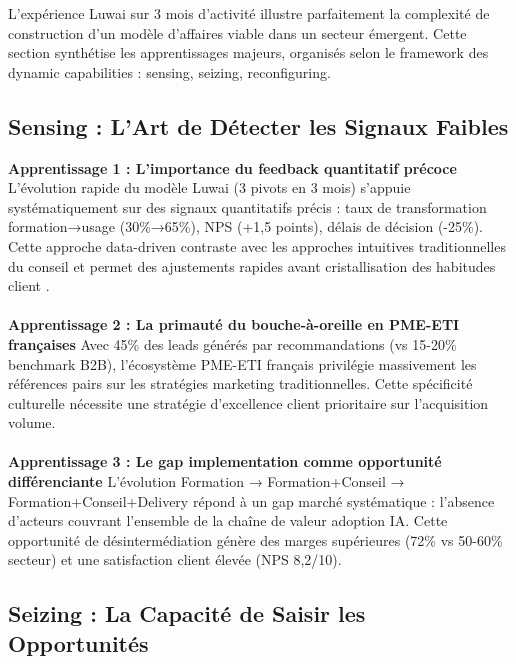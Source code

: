 L'expérience Luwai sur 3 mois d'activité illustre parfaitement la complexité de construction d'un modèle d'affaires viable dans un secteur émergent. Cette section synthétise les apprentissages majeurs, organisés selon le framework des dynamic capabilities \cite{teece2007dynamic} : sensing, seizing, reconfiguring.

\subsection{Sensing : L'Art de Détecter les Signaux Faibles}

\textbf{Apprentissage 1 : L'importance du feedback quantitatif précoce}
L'évolution rapide du modèle Luwai (3 pivots en 3 mois) s'appuie systématiquement sur des signaux quantitatifs précis : taux de transformation formation→usage (30\%→65\%), NPS (+1,5 points), délais de décision (-25\%). Cette approche data-driven contraste avec les approches intuitives traditionnelles du conseil et permet des ajustements rapides avant cristallisation des habitudes client \cite{ries2011lean}.
\\\\
\textbf{Apprentissage 2 : La primauté du bouche-à-oreille en PME-ETI françaises}
Avec 45\% des leads générés par recommandations (vs 15-20\% benchmark B2B), l'écosystème PME-ETI français privilégie massivement les références pairs sur les stratégies marketing traditionnelles. Cette spécificité culturelle \cite{hofstede2001culture} nécessite une stratégie d'excellence client prioritaire sur l'acquisition volume.
\\\\
\textbf{Apprentissage 3 : Le gap implementation comme opportunité différenciante}
L'évolution Formation → Formation+Conseil → Formation+Conseil+Delivery répond à un gap marché systématique : l'absence d'acteurs couvrant l'ensemble de la chaîne de valeur adoption IA. Cette opportunité de désintermédiation génère des marges supérieures (72\% vs 50-60\% secteur) et une satisfaction client élevée (NPS 8,2/10).

\subsection{Seizing : La Capacité de Saisir les Opportunités}

